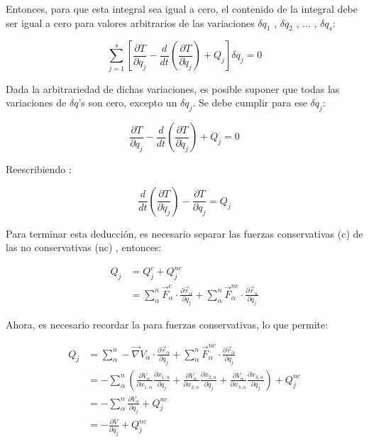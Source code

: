 \documentclass[/home/hernan-barquero/Documents/Apuntes_mecanica_teorica/main.tex]{subfiles}
\begin{document}
    Entonces, para que esta integral sea igual a cero, el contenido de la integral debe ser igual a cero para valores arbitrarios de las variaciones $\delta q_{1}$ , $\delta q_{2}$ , ... , $\delta q_{s}$: 

    \begin{equation*}
        \sum_{j=1}^{s}  \left[\frac{\partial T}{\partial q_{j}}  - \frac{d}{d t} \left(\frac{\partial T}{\partial \dot{q}_{j}} \right)     + Q_{j}  \right] \delta q_{j} = 0
    \end{equation*}

    Dada la arbitrariedad de dichas variaciones, es posible suponer que todas las variaciones de $\delta q$'s son cero, excepto un $\delta q_{j}$. Se debe cumplir para ese $\delta q_{j}$:

    \begin{equation*}
        \frac{\partial T}{\partial q_{j}}  - \frac{d}{d t} \left(\frac{\partial T}{\partial \dot{q}_{j}} \right)     + Q_{j} = 0
    \end{equation*}

    Reescribiendo :

    \begin{equation*}
        \frac{d}{d t} \left(\frac{\partial T}{\partial \dot{q}_{j}} \right) - \frac{\partial T}{\partial q_{j}} = Q_{j}
    \end{equation*}

    Para terminar esta deducción, es necesario separar las fuerzas conservativas (c) de las no conservativas (nc) , entonces:

    \begin{align*}
        Q_{j} & = Q_{j}^{c} + Q_{j}^{nc} \\ 
            & = \sum_{\alpha}^{n} \vec{F}_{\alpha}^{c} \cdot \frac{\partial \vec{r}_{\alpha}}{\partial q_{j}} + \sum_{\alpha}^{n} \vec{F}_{\alpha}^{nc} \cdot \frac{\partial \vec{r}_{\alpha}}{\partial q_{j}}
    \end{align*}

    Ahora, es necesario recordar la  para fuerzas conservativas, lo que permite: 

    \begin{align*}
        Q_{j} & = \sum_{\alpha}^{n} - \vec{\nabla} V_{\alpha} \cdot \frac{\partial \vec{r}_{\alpha}}{\partial q_{j}} + \sum_{\alpha}^{n} \vec{F}_{\alpha}^{nc} \cdot \frac{\partial \vec{r}_{\alpha}}{\partial q_{j}} \\ 
        & =  - \sum_{\alpha}^{n} \left( \frac{\partial V_{\alpha}}{\partial x_{1,\alpha}} \frac{\partial x_{1,\alpha}}{\partial q_{j}} +   \frac{\partial V_{\alpha}}{\partial x_{2,\alpha}} \frac{\partial x_{2,\alpha}}{\partial q_{j}} + \frac{\partial V_{\alpha}}{\partial x_{3,\alpha}} \frac{\partial x_{3,\alpha}}{\partial q_{j}} \right) + Q_{j}^{nc} \\ 
        & = - \sum_{\alpha}^{n} \frac{\partial V_{\alpha}}{\partial q_{j}} + Q_{j}^{nc} \\ 
        & = - \frac{\partial V}{\partial q_{j}} + Q_{j}^{nc}
    \end{align*}
\end{document}
